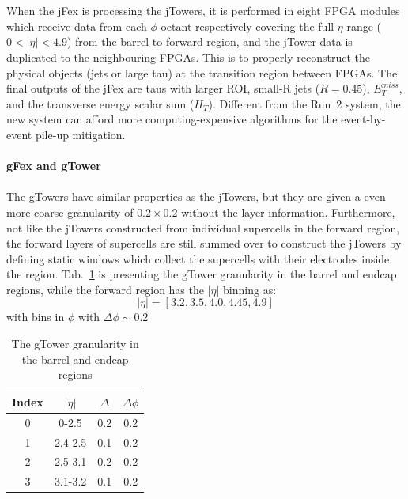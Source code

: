 \\
\\When the jFex is processing the jTowers, it is performed in eight FPGA modules which receive data from each $\phi$-octant respectively covering the full $\eta$ range ($0<|\eta|<4.9$) from the barrel to forward region, and the jTower data is duplicated to the neighbouring FPGAs\cite{Aad:1602235}. This is to properly reconstruct the physical objects (jets or large tau) at the transition region between FPGAs. The final outputs of the jFex are taus with larger ROI, small-R jets ($R=0.45$), $E^{miss}_{T}$, and the transverse energy scalar sum ($H_{T}$). Different from the Run~2 system, the new system can afford more computing-expensive algorithms for the event-by-event pile-up mitigation. 
\\
\\{\bf gFex and gTower}
\\
\\The gTowers have similar properties as the jTowers, but they are given a even more coarse granularity of $0.2\times0.2$ without the layer information. Furthermore, not like the jTowers constructed from individual supercells in the forward region, the forward layers of supercells are still summed over to construct the jTowers by defining static windows which collect the supercells with their electrodes inside the region. Tab.~\ref{Tab:granularity_gT} is presenting the gTower granularity in the barrel and endcap regions, while the forward region has the $|\eta|$ binning as:
\begin{equation}
|\eta| = \left[3.2, 3.5, 4.0, 4.45, 4.9\right]
\end{equation}
with bins in $\phi$ with $\Delta\phi\sim0.2$
\begin{table}[h]
	\caption{The gTower granularity in the barrel and endcap regions}
	\renewcommand{\arraystretch}{1.3}
	\centering
	\begin{tabular}{| c | c | c | c | }
		\hline
		\hline
		Index      &    $|\eta|$        &     $\Delta$     & $\Delta\phi$   \\
		\hline
		0          &     0-2.5          & 0.2                          &  0.2                          \\
		\hline
		1          &     2.4-2.5           & 0.1                          &  0.2                         \\
		\hline
		2      &     2.5-3.1       & 0.2                      &  0.2                       \\
		\hline 
		3      &     3.1-3.2       & 0.1                      &  0.2                       \\
		\hline
		\hline
	\end{tabular}
	\label{Tab:granularity_gT}
\end{table}
